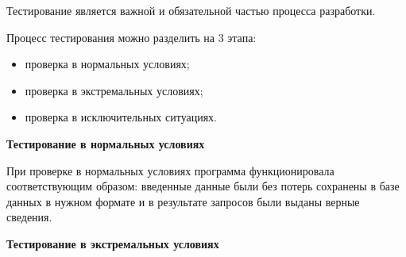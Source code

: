Тестирование является важной и обязательной частью процесса разработки.

Процесс тестирования можно разделить на 3 этапа:
\begin{itemize}
  \item проверка в нормальных условиях;
  \item проверка в экстремальных условиях;
  \item проверка в исключительных ситуациях.
\end{itemize}

\textbf{Тестирование в нормальных условиях}

При проверке в нормальных условиях программа функционировала соответствующим образом:
введенные данные были без потерь сохранены в базе данных в нужном формате и в результате запросов были выданы верные сведения.

\textbf{Тестирование в экстремальных условиях}
